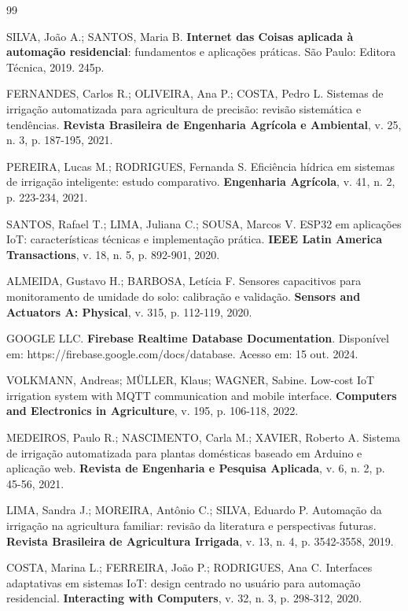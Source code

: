
\begin{thebibliography}{99}

SILVA, João A.; SANTOS, Maria B. \textbf{Internet das Coisas aplicada à automação residencial}: fundamentos e aplicações práticas. São Paulo: Editora Técnica, 2019. 245p.

FERNANDES, Carlos R.; OLIVEIRA, Ana P.; COSTA, Pedro L. Sistemas de irrigação automatizada para agricultura de precisão: revisão sistemática e tendências. \textbf{Revista Brasileira de Engenharia Agrícola e Ambiental}, v. 25, n. 3, p. 187-195, 2021.

PEREIRA, Lucas M.; RODRIGUES, Fernanda S. Eficiência hídrica em sistemas de irrigação inteligente: estudo comparativo. \textbf{Engenharia Agrícola}, v. 41, n. 2, p. 223-234, 2021.

SANTOS, Rafael T.; LIMA, Juliana C.; SOUSA, Marcos V. ESP32 em aplicações IoT: características técnicas e implementação prática. \textbf{IEEE Latin America Transactions}, v. 18, n. 5, p. 892-901, 2020.

ALMEIDA, Gustavo H.; BARBOSA, Letícia F. Sensores capacitivos para monitoramento de umidade do solo: calibração e validação. \textbf{Sensors and Actuators A: Physical}, v. 315, p. 112-119, 2020.

GOOGLE LLC. \textbf{Firebase Realtime Database Documentation}. Disponível em: https://firebase.google.com/docs/database. Acesso em: 15 out. 2024.

VOLKMANN, Andreas; MÜLLER, Klaus; WAGNER, Sabine. Low-cost IoT irrigation system with MQTT communication and mobile interface. \textbf{Computers and Electronics in Agriculture}, v. 195, p. 106-118, 2022.

MEDEIROS, Paulo R.; NASCIMENTO, Carla M.; XAVIER, Roberto A. Sistema de irrigação automatizada para plantas domésticas baseado em Arduino e aplicação web. \textbf{Revista de Engenharia e Pesquisa Aplicada}, v. 6, n. 2, p. 45-56, 2021.

LIMA, Sandra J.; MOREIRA, Antônio C.; SILVA, Eduardo P. Automação da irrigação na agricultura familiar: revisão da literatura e perspectivas futuras. \textbf{Revista Brasileira de Agricultura Irrigada}, v. 13, n. 4, p. 3542-3558, 2019.

COSTA, Marina L.; FERREIRA, João P.; RODRIGUES, Ana C. Interfaces adaptativas em sistemas IoT: design centrado no usuário para automação residencial. \textbf{Interacting with Computers}, v. 32, n. 3, p. 298-312, 2020.


\end{thebibliography}
